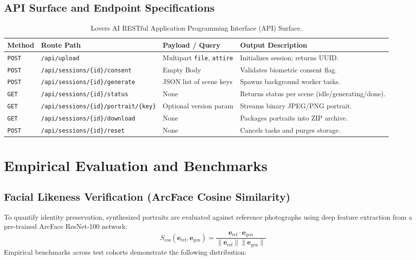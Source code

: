\documentclass[11pt,a4paper]{article}
\begin{document}
\subsection{API Surface and Endpoint Specifications}

\begin{table}[htbp]
\centering
\caption{Lovers AI RESTful Application Programming Interface (API) Surface.}
\label{tab:api}
\begin{tabularx}{\textwidth}{llll}
\toprule
\textbf{Method} & \textbf{Route Path} & \textbf{Payload / Query} & \textbf{Output Description} \\
\midrule
\texttt{POST} & \texttt{/api/upload} & Multipart \texttt{file}, \texttt{attire} & Initializes session; returns UUID. \\
\texttt{POST} & \texttt{/api/sessions/\{id\}/consent} & Empty Body & Validates biometric consent flag. \\
\texttt{POST} & \texttt{/api/sessions/\{id\}/generate} & JSON list of scene keys & Spawns background worker tasks. \\
\texttt{GET}  & \texttt{/api/sessions/\{id\}/status}   & None & Returns status per scene (idle/generating/done). \\
\texttt{GET}  & \texttt{/api/sessions/\{id\}/portrait/\{key\}} & Optional version param & Streams binary JPEG/PNG portrait. \\
\texttt{GET}  & \texttt{/api/sessions/\{id\}/download} & None & Packages portraits into ZIP archive. \\
\texttt{POST} & \texttt{/api/sessions/\{id\}/reset}    & None & Cancels tasks and purges storage. \\
\bottomrule
\end{tabularx}
\end{table}

\section{Empirical Evaluation and Benchmarks}

\subsection{Facial Likeness Verification (ArcFace Cosine Similarity)}
To quantify identity preservation, synthesized portraits are evaluated against reference photographs using deep feature extraction from a pre-trained ArcFace ResNet-100 network:
\begin{equation}
    S_{\text{cos}}(\mathbf{e}_{\text{ref}}, \mathbf{e}_{\text{gen}}) = \frac{\mathbf{e}_{\text{ref}} \cdot \mathbf{e}_{\text{gen}}}{\|\mathbf{e}_{\text{ref}}\| \|\mathbf{e}_{\text{gen}}\|}
\end{equation}
Empirical benchmarks across test cohorts demonstrate the following distribution:
\end{document}
